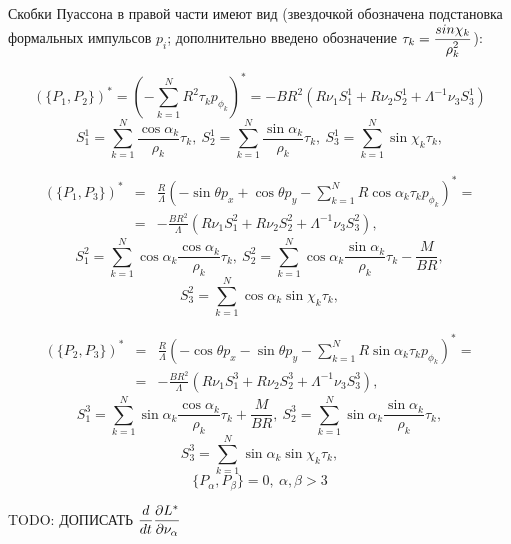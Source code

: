 Скобки Пуассона в правой части имеют вид (звездочкой обозначена подстановка формальных импульсов $p_i$; дополнительно введено обозначение $\tau_k = \displaystyle\frac{\displaystyle sin\chi_k}{\displaystyle \rho_k^2}$):

$$
(\{P_1,P_2\})^* = (-\sum\limits_{k=1}^{N} R^2\tau_kp_{\phi_k})^* =
-BR^2(R\nu_1 S_1^1 + R\nu_2 S_2^1 + \Lambda^{-1}\nu_3S_3^1)$$
$$
S_1^1 = \sum\limits_{k=1}^{N}\frac{\cos\alpha_k}{\rho_k}\tau_k,\
S_2^1 = \sum\limits_{k=1}^{N}\frac{\sin\alpha_k}{\rho_k}\tau_k,\
S_3^1 = \sum\limits_{k=1}^{N}\sin\chi_k\tau_k,
$$

\begin{eqnarray*}
(\{P_1,P_3\})^* &=& \frac{R}{\Lambda}\left(-\sin\theta p_x + \cos\theta p_y - \sum\limits_{k=1}^{N} R\cos\alpha_k\tau_kp_{\phi_k}\right)^* =\\
&=& -\frac{BR^2}{\Lambda}(R\nu_1 S_1^2 + R\nu_2 S_2^2 + \Lambda^{-1}\nu_3S_3^2),
\end{eqnarray*}
$$
S_1^2 = \sum\limits_{k=1}^{N}\cos\alpha_k\frac{\cos\alpha_k}{\rho_k}\tau_k,\
S_2^2 = \sum\limits_{k=1}^{N}\cos\alpha_k\frac{\sin\alpha_k}{\rho_k}\tau_k - \frac{M}{BR},
$$$$
S_3^2 = \sum\limits_{k=1}^{N}\cos\alpha_k\sin\chi_k\tau_k,
$$

\begin{eqnarray*}
(\{P_2,P_3\})^* &=& \frac{R}{\Lambda}\left(-\cos\theta p_x - \sin\theta p_y - \sum\limits_{k=1}^{N} R\sin\alpha_k\tau_kp_{\phi_k}\right)^*  =\\
&=& -\frac{BR^2}{\Lambda}(R\nu_1 S_1^3 + R\nu_2 S_2^3 + \Lambda^{-1}\nu_3S_3^3),
\end{eqnarray*}
$$
S_1^3 = \sum\limits_{k=1}^{N}\sin\alpha_k\frac{\cos\alpha_k}{\rho_k}\tau_k + \frac{M}{BR},\
S_2^3 = \sum\limits_{k=1}^{N}\sin\alpha_k\frac{\sin\alpha_k}{\rho_k}\tau_k,
$$$$
S_3^3 = \sum\limits_{k=1}^{N}\sin\alpha_k\sin\chi_k\tau_k,
$$
$$
\{P_\alpha, P_\beta\} =0,\ \alpha,\beta >3
$$

TODO: ДОПИСАТЬ $\displaystyle\frac{\displaystyle d}{\displaystyle dt}\frac{\partial L^{*}}{\partial \nu_\alpha}$